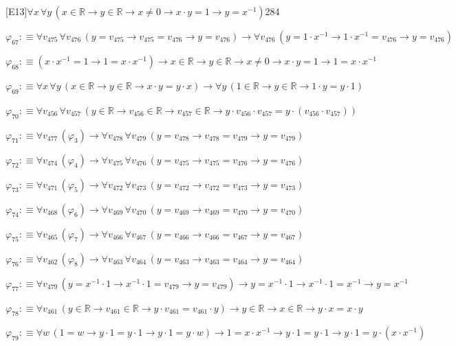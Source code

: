 \begin{fullproof}{[E13]}{$\forall x\,\forall y\,(x \in \mathbb{R} \to y \in \mathbb{R} \to x \neq 0 \to x \cdot y = 1 \to y = x^{-1})$}{284}
\begin{abbrevlist}
\item $\varphi_{67} :\equiv \forall v_{475}\,\forall v_{476}\,(y = v_{475} \to v_{475} = v_{476} \to y = v_{476}) \to \forall v_{476}\,(y = 1 \cdot x^{-1} \to 1 \cdot x^{-1} = v_{476} \to y = v_{476})$
\item $\varphi_{68} :\equiv (x \cdot x^{-1} = 1 \to 1 = x \cdot x^{-1}) \to x \in \mathbb{R} \to y \in \mathbb{R} \to x \neq 0 \to x \cdot y = 1 \to 1 = x \cdot x^{-1}$
\item $\varphi_{69} :\equiv \forall x\,\forall y\,(x \in \mathbb{R} \to y \in \mathbb{R} \to x \cdot y = y \cdot x) \to \forall y\,(1 \in \mathbb{R} \to y \in \mathbb{R} \to 1 \cdot y = y \cdot 1)$
\item $\varphi_{70} :\equiv \forall v_{456}\,\forall v_{457}\,(y \in \mathbb{R} \to v_{456} \in \mathbb{R} \to v_{457} \in \mathbb{R} \to y \cdot v_{456} \cdot v_{457} = y \cdot (v_{456} \cdot v_{457}))$
\item $\varphi_{71} :\equiv \forall v_{477}\,(\varphi_{3}) \to \forall v_{478}\,\forall v_{479}\,(y = v_{478} \to v_{478} = v_{479} \to y = v_{479})$
\item $\varphi_{72} :\equiv \forall v_{474}\,(\varphi_{4}) \to \forall v_{475}\,\forall v_{476}\,(y = v_{475} \to v_{475} = v_{476} \to y = v_{476})$
\item $\varphi_{73} :\equiv \forall v_{471}\,(\varphi_{5}) \to \forall v_{472}\,\forall v_{473}\,(y = v_{472} \to v_{472} = v_{473} \to y = v_{473})$
\item $\varphi_{74} :\equiv \forall v_{468}\,(\varphi_{6}) \to \forall v_{469}\,\forall v_{470}\,(y = v_{469} \to v_{469} = v_{470} \to y = v_{470})$
\item $\varphi_{75} :\equiv \forall v_{465}\,(\varphi_{7}) \to \forall v_{466}\,\forall v_{467}\,(y = v_{466} \to v_{466} = v_{467} \to y = v_{467})$
\item $\varphi_{76} :\equiv \forall v_{462}\,(\varphi_{8}) \to \forall v_{463}\,\forall v_{464}\,(y = v_{463} \to v_{463} = v_{464} \to y = v_{464})$
\item $\varphi_{77} :\equiv \forall v_{479}\,(y = x^{-1} \cdot 1 \to x^{-1} \cdot 1 = v_{479} \to y = v_{479}) \to y = x^{-1} \cdot 1 \to x^{-1} \cdot 1 = x^{-1} \to y = x^{-1}$
\item $\varphi_{78} :\equiv \forall v_{461}\,(y \in \mathbb{R} \to v_{461} \in \mathbb{R} \to y \cdot v_{461} = v_{461} \cdot y) \to y \in \mathbb{R} \to x \in \mathbb{R} \to y \cdot x = x \cdot y$
\item $\varphi_{79} :\equiv \forall w\,(1 = w \to y \cdot 1 = y \cdot 1 \to y \cdot 1 = y \cdot w) \to 1 = x \cdot x^{-1} \to y \cdot 1 = y \cdot 1 \to y \cdot 1 = y \cdot (x \cdot x^{-1})$

\end{abbrevlist}
\end{fullproof}
